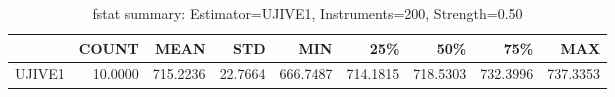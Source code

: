 \begin{table}[ht]
\centering
\caption{fstat summary: Estimator=UJIVE1, Instruments=200, Strength=0.50}
\begin{tabular}{lrrrrrrrr}
\toprule
 & COUNT & MEAN & STD & MIN & 25\% & 50\% & 75\% & MAX \\
\midrule
UJIVE1 & 10.0000 & 715.2236 & 22.7664 & 666.7487 & 714.1815 & 718.5303 & 732.3996 & 737.3353 \\
\bottomrule
\end{tabular}
\end{table}
